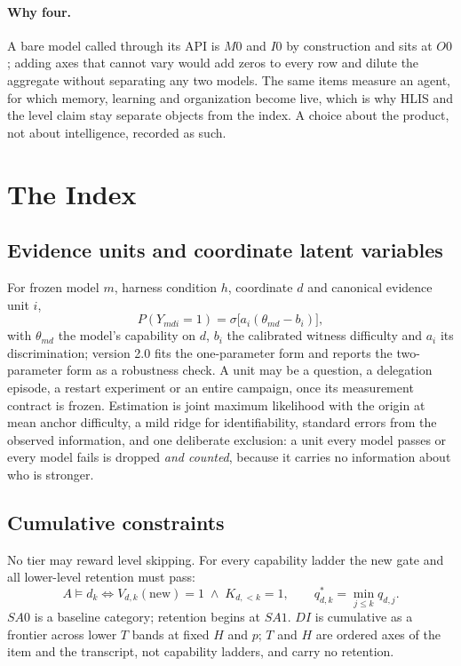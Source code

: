 \paragraph{Why four.} A bare model called through its API is $M0$ and $I0$ by construction and sits at $O0$; adding axes that cannot vary would add zeros to every row and dilute the aggregate without separating any two models. The same items measure an agent, for which memory, learning and organization become live, which is why HLIS and the level claim stay separate objects from the index. A choice about the product, not about intelligence, recorded as such.

\section{The Index}\label{sec:index}

\subsection{Evidence units and coordinate latent variables}
For frozen model $m$, harness condition $h$, coordinate $d$ and canonical evidence unit $i$,
\[
P(Y_{mdi} = 1) = \sigma\!\big[a_i(\theta_{md} - b_i)\big],
\]
with $\theta_{md}$ the model's capability on $d$, $b_i$ the calibrated witness difficulty and $a_i$ its discrimination; version 2.0 fits the one-parameter form and reports the two-parameter form as a robustness check. A unit may be a question, a delegation episode, a restart experiment or an entire campaign, once its measurement contract is frozen. Estimation is joint maximum likelihood with the origin at mean anchor difficulty, a mild ridge for identifiability, standard errors from the observed information, and one deliberate exclusion: a unit every model passes or every model fails is dropped \emph{and counted}, because it carries no information about who is stronger.

\subsection{Cumulative constraints}
No tier may reward level skipping. For every capability ladder the new gate and all lower-level retention must pass:
\[
A \models d_k \iff V_{d,k}(\text{new}) = 1 \;\wedge\; K_{d,<k} = 1, \qquad q^{*}_{d,k} = \min_{j \le k} q_{d,j}.
\]
$SA0$ is a baseline category; retention begins at $SA1$. $DI$ is cumulative as a frontier across lower $T$ bands at fixed $H$ and $p$; $T$ and $H$ are ordered axes of the item and the transcript, not capability ladders, and carry no retention.

